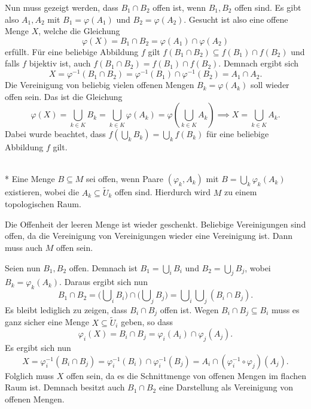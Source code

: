 Nun muss gezeigt werden, dass $B_1\cap B_2$ offen ist,
wenn $B_1,B_2$ offen sind. Es gibt also $A_1,A_2$ mit $B_1=\varphi(A_1)$
und $B_2=\varphi(A_2)$. Gesucht ist also eine offene Menge $X$,
welche die Gleichung
\begin{equation}
\varphi(X) = B_1\cap B_2 = \varphi(A_1)\cap\varphi(A_2)
\end{equation}
erfüllt. Für eine beliebige Abbildung $f$ gilt
$f(B_1\cap B_2) \subseteq f(B_1)\cap f(B_2)$ und falls $f$
bijektiv ist, auch $f(B_1\cap B_2)=f(B_1)\cap f(B_2)$. Demnach
ergibt sich
\begin{equation}
X = \varphi^{-1}(B_1\cap B_2) = \varphi^{-1}(B_1)\cap\varphi^{-1}(B_2)
= A_1\cap A_2.
\end{equation}
Die Vereinigung von beliebig vielen offenen Mengen $B_k=\varphi(A_k)$
soll wieder offen sein. Das ist die Gleichung
\begin{equation}
\varphi(X) = \bigcup_{k\in K} B_k = \bigcup_{k\in K} \varphi(A_k)
= \varphi(\bigcup_{k\in K} A_k)
\implies X=\bigcup_{k\in K} A_k.
\end{equation}
Dabei wurde beachtet, dass $f(\bigcup_k B_k) = \bigcup_k f(B_k)$
für eine beliebige Abbildung $f$ gilt.\;\qedsymbol

\begin{theorem}\mbox{}\\*
Eine Menge $B\subseteq M$ sei offen, wenn Paare $(\varphi_k,A_k)$
mit $B=\bigcup_k\varphi_k(A_k)$ existieren, wobei die
$A_k\subseteq\tilde U_k$ offen sind.
Hierdurch wird $M$ zu einem topologischen Raum.
\end{theorem}

\noindent{}
Die Offenheit der leeren Menge ist wieder geschenkt.
Beliebige Vereinigungen sind offen, da die Vereinigung von
Vereinigungen wieder eine Vereinigung ist. Dann muss auch
$M$ offen sein.

Seien nun $B_1,B_2$ offen. Demnach ist $B_1=\bigcup_i B_i$
und $B_2=\bigcup_j B_j$, wobei $B_k=\varphi_k(A_k)$.
Daraus ergibt sich nun
\begin{equation}
B_1\cap B_2 = \Big(\bigcup\nolimits_i B_i\Big)
\cap\Big(\bigcup\nolimits_j B_j\Big)
= \bigcup\nolimits_i \bigcup\nolimits_j (B_i\cap B_j).
\end{equation}
Es bleibt lediglich zu zeigen, dass $B_i\cap B_j$ offen ist.
Wegen $B_i\cap B_j\subseteq B_i$ muss es ganz sicher eine Menge
$X\subseteq\tilde U_i$ geben, so dass
\begin{equation}
\varphi_i(X) = B_i\cap B_j = \varphi_i(A_i)\cap\varphi_j(A_j).
\end{equation}
Es ergibt sich nun
\begin{equation}
X = \varphi_i^{-1}(B_i\cap B_j)
= \varphi_i^{-1}(B_i)\cap\varphi_i^{-1}(B_j)
= A_i\cap (\varphi_i^{-1}{\circ}\varphi_j)(A_j).
\end{equation}
Folglich muss $X$ offen sein, da es die Schnittmenge von offenen
Mengen im flachen Raum ist. Demnach besitzt auch $B_1\cap B_2$
eine Darstellung als Vereinigung von offenen Mengen.\;\qedsymbol

